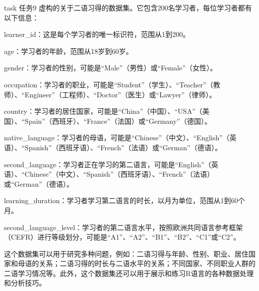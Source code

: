 \documentclass[]{book}
\begin{document}
\begin{infobox}task
任务9
虚构的关于二语习得的数据集。它包含200名学习者，每位学习者都有以下信息：

learner\_id：这是每个学习者的唯一标识符，范围从1到200。

age：学习者的年龄，范围从18岁到60岁。

gender：学习者的性别，可能是``Male''（男性）或``Female''（女性）。

occupation：学习者的职业，可能是``Student''（学生）、``Teacher''（教师）、``Engineer''（工程师）、``Doctor''（医生）或``Lawyer''（律师）。

country：学习者的居住国家，可能是``China''（中国）、``USA''（美国）、``Spain''（西班牙）、``France''（法国）或``Germany''（德国）。

native\_language：学习者的母语，可能是``Chinese''（中文）、``English''（英语）、``Spanish''（西班牙语）、``French''（法语）或``German''（德语）。

second\_language：学习者正在学习的第二语言，可能是``English''（英语）、``Chinese''（中文）、``Spanish''（西班牙语）、``French''（法语）或``German''（德语）。

learning\_duration：学习者学习第二语言的时长，以月为单位，范围从1到60个月。

second\_language\_level：学习者的第二语言水平，按照欧洲共同语言参考框架（CEFR）进行等级划分，可能是``A1''、``A2''、``B1''、``B2''、``C1''或``C2''。

这个数据集可以用于研究多种问题，例如：二语习得与年龄、性别、职业、居住国家和母语的关系；二语习得的时长与二语水平的关系；不同国家、不同职业人群的二语学习情况等。此外，这个数据集还可以用于展示和练习R语言的各种数据处理和分析技巧。

\end{infobox}
\end{document}
